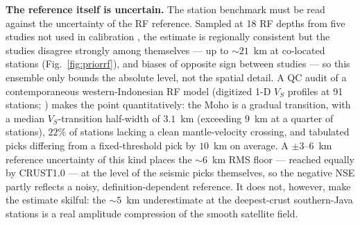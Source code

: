 \documentclass[extra,mreferee]{gji}
\begin{document}
\textbf{The reference itself is uncertain.} The station benchmark must be read
against the uncertainty of the RF reference. Sampled at 18 RF depths from five
studies not used in calibration \citep{kieling2011,macpherson2012,bora2016,syuhada2016,anggono2020},
the estimate is regionally consistent but the studies disagree strongly among
themselves --- up to $\sim21$~km at co-located stations (Fig.~\ref{fig:priorrf}), and
biases of opposite sign between studies --- so this ensemble only bounds the absolute
level, not the spatial detail. A QC audit of a contemporaneous western-Indonesian RF
model (digitized 1-D $V_S$ profiles at 91 stations; \citealt{bahri2021}) makes the
point quantitatively: the Moho is a gradual transition, with a median $V_S$-transition
half-width of $3.1$~km (exceeding $9$~km at a quarter of stations), $22\%$ of stations
lacking a clean mantle-velocity crossing, and tabulated picks differing from a
fixed-threshold pick by $10$~km on average. A $\pm3$--$6$~km reference uncertainty of
this kind places the $\sim$6~km RMS floor --- reached equally by {CRUST1.0} --- at
the level of the seismic picks themselves, so the negative NSE partly reflects a
noisy, definition-dependent reference. It does not, however, make the estimate
skilful: the $\sim5$~km underestimate at the deepest-crust southern-Java stations is a
real amplitude compression of the smooth satellite field.
\end{document}
